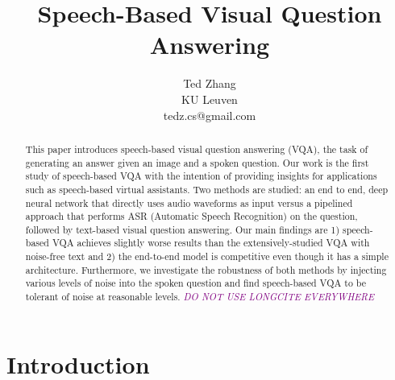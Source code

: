 \documentclass[letterpaper]{article} %
\newcommand{\tz}[1]{\textcolor{purple}{\textit{#1}}}
\begin{document}
\title{Speech-Based Visual Question Answering}

\author{Ted Zhang\\
KU Leuven\\
tedz.cs@gmail.com}




\maketitle
\begin{abstract}
This paper introduces speech-based visual question answering (VQA), the task of generating an answer given an image and a spoken question. Our work is the first study of speech-based VQA with the intention of providing insights for applications such as speech-based virtual assistants. Two methods are studied: an end to end, deep neural network that directly uses audio waveforms as input versus a pipelined approach that performs ASR (Automatic Speech Recognition) on the question, followed by text-based visual question answering. Our main findings are 1) speech-based VQA achieves slightly worse results than the extensively-studied VQA with noise-free text and 2) the end-to-end model is competitive even though it has a simple architecture. Furthermore, we investigate the robustness of both methods by injecting various levels of noise into the spoken question and find speech-based VQA to be tolerant of noise at reasonable levels.
\tz{DO NOT USE LONGCITE EVERYWHERE}

\end{abstract}
\label{sec:intro}
\section{Introduction}
\end{document}
